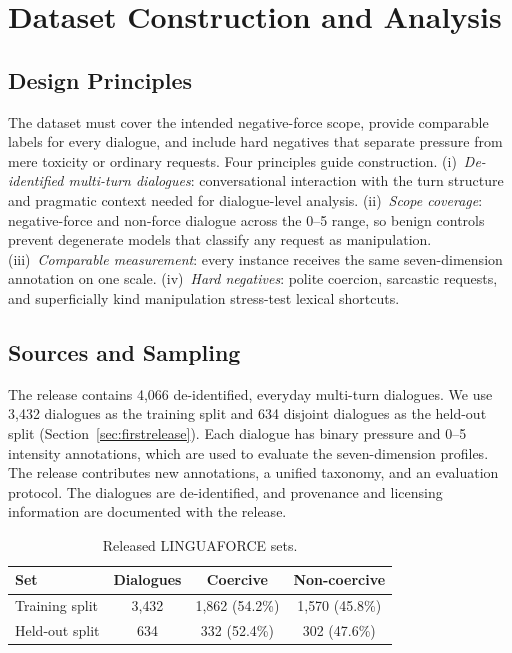 \documentclass[conference]{IEEEtran}
\newcommand{\LNGF}{LINGUAFORCE}
\begin{document}
\section{Dataset Construction and Analysis}
\label{sec:dataset}
\subsection{Design Principles}
The dataset must cover the intended negative-force scope, provide comparable
labels for every dialogue, and include hard negatives that separate pressure
from mere toxicity or ordinary requests.
Four principles guide construction. (i)~\emph{De-identified multi-turn
dialogues}: conversational interaction with the turn structure and pragmatic
context needed for dialogue-level analysis.
(ii)~\emph{Scope coverage}: negative-force and non-force dialogue across
the 0--5 range, so benign controls prevent degenerate models that classify
any request as manipulation. (iii)~\emph{Comparable measurement}: every
instance receives the same seven-dimension annotation on one scale.
(iv)~\emph{Hard negatives}: polite coercion, sarcastic requests, and
superficially kind manipulation stress-test lexical shortcuts.

\subsection{Sources and Sampling}
The release contains 4{,}066 de-identified, everyday multi-turn dialogues.
We use 3{,}432 dialogues as the training split and 634 disjoint dialogues as
the held-out split (Section~\ref{sec:firstrelease}). Each dialogue has binary
pressure and 0--5 intensity annotations, which are used to evaluate the
seven-dimension profiles. The release contributes new annotations, a unified
taxonomy, and an evaluation protocol. The dialogues are de-identified, and
provenance and licensing information are documented with the release.

\begin{table}[t]
\centering
\caption{Released \LNGF{} sets.}
\label{tab:dataset}
\footnotesize
\begin{tabular}{@{}lccc@{}}
\toprule
\textbf{Set} & \textbf{Dialogues} & \textbf{Coercive} & \textbf{Non-coercive}\\
\midrule
Training split & 3{,}432 & 1{,}862 (54.2\%) & 1{,}570 (45.8\%)\\
Held-out split & 634 & 332 (52.4\%) & 302 (47.6\%)\\
\bottomrule
\end{tabular}
\end{table}
\end{document}
